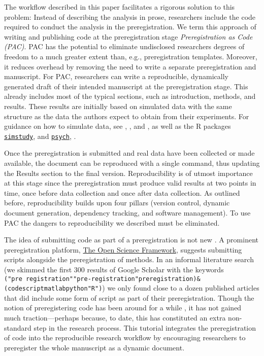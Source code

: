 \documentclass[psych,tutorial,submit,moreauthors,pdftex]{mdpi}
\begin{document}
The workflow described in this paper facilitates a rigorous solution to
this problem: Instead of describing the analysis in prose, researchers
include the code required to conduct the analysis in the
preregistration. We term this approach of writing and publishing code at
the preregistration stage \emph{Preregistration as Code (PAC)}. PAC has
the potential to eliminate undisclosed researchers degrees of freedom to
a much greater extent than, e.g., preregistration templates. Moreover,
it reduces overhead by removing the need to write a separate
preregistration and manuscript. For PAC, researchers can write a
reproducible, dynamically generated draft of their intended manuscript
at the preregistration stage. This already includes most of the typical
sections, such as introduction, methods, and results. These results are
initially based on simulated data with the same structure as the data
the authors expect to obtain from their experiments. For guidance on how
to simulate data, see \citet{morrisUsingSimulationStudies2019},
\citet{paxtonMonteCarloExperiments2001}, and
\citet{skrondalDesignAnalysisMonte2000}, as well as the R packages
\href{https://cran.r-project.org/web/packages/simstudy/vignettes/simstudy.html}{\texttt{simstudy}},
\citep{simstudy} and
\href{https://personality-project.org/r/psych/help/sim.html}{\texttt{psych}},
\citep{psych}.

Once the preregistration is submitted and real data have been collected
or made available, the document can be reproduced with a single command,
thus updating the Results section to the final version. Reproducibility
is of utmost importance at this stage since the preregistration must
produce valid results at two points in time, once before data collection
and once after data collection. As outlined before, reproducibility
builds upon four pillars (version control, dynamic document generation,
dependency tracking, and software management). To use PAC the dangers to
reproducibility we described must be eliminated.

The idea of submitting code as part of a preregistration is not new
\citep[e.g.][]{wichertsDegreesFreedomPlanning2016}. A prominent
preregistration platform, \href{https://osf.io/}{The Open Science
Framework}, suggests submitting scripts alongside the preregistration of
methods. In an informal literature search (we skimmed the first 300
results of Google Scholar with the keywords
\texttt{("pre\ registration"\textbar{}"pre-registration"\textbar{}preregistration)\&(code\textbar{}script\textbar{}matlab\textbar{}python\textbar{}"R")})
we only found close to a dozen published articles that did include some
form of script as part of their preregistration. Though the notion of
preregistering code has been around for a while
\citep[cf.][]{steegenMeasuringCrowdAgain2014}, it has not gained much
traction---perhaps because, to date, this has constituted an extra
non-standard step in the research process. This tutorial integrates the
preregistration of code into the reproducible research workflow by
encouraging researchers to preregister the whole manuscript as a dynamic
document.
\end{document}
